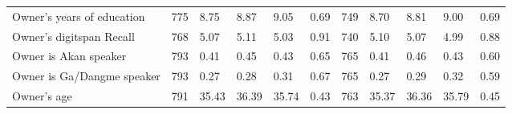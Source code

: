 \documentclass{report}
\begin{document}
\begin{table}[H]
{\begin{tabular}{lllllllllll}
\hspace{1em}Owner's years of education & 775 & 8.75 & 8.87 & 9.05 & 0.69 & 749 & 8.70 & 8.81 & 9.00 & 0.69\\
\hspace{1em}Owner's digitspan Recall & 768 & 5.07 & 5.11 & 5.03 & 0.91 & 740 & 5.10 & 5.07 & 4.99 & 0.88\\
\hspace{1em}Owner is Akan speaker & 793 & 0.41 & 0.45 & 0.43 & 0.65 & 765 & 0.41 & 0.46 & 0.43 & 0.60\\
\hspace{1em}Owner is Ga/Dangme speaker & 793 & 0.27 & 0.28 & 0.31 & 0.67 & 765 & 0.27 & 0.29 & 0.32 & 0.59\\
\hspace{1em}Owner's age & 791 & 35.43 & 36.39 & 35.74 & 0.43 & 763 & 35.37 & 36.36 & 35.79 & 0.45\\
\bottomrule
\end{tabular}}
\end{table}
\end{document}
